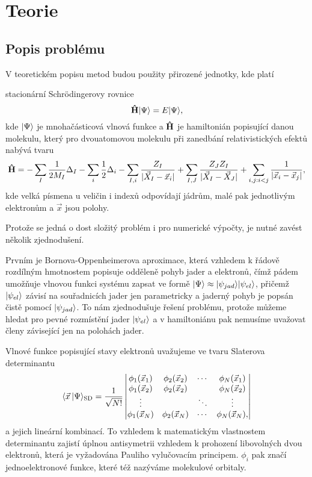 \chapter{Teorie}
\section{Popis problému}
\label{approx}
V teoretickém popisu metod budou použity přirozené jednotky, kde platí


stacionární Schrödingerovy rovnice
\begin{equation}
\mathbf{\hat{H}}| \Psi \rangle = E| \Psi \rangle,
\end{equation}
kde $| \Psi \rangle$ je mnohačásticová vlnová funkce a $\mathbf{\hat{H}}$ je hamiltonián popisující 
danou molekulu, který pro dvouatomovou molekulu při zanedbání relativistických efektů nabývá tvaru
\begin{equation}
\mathbf{\hat{H}} =-\sum_{I}\frac{1}{2M_I}\Delta_I 
-\sum_{i}\frac{1}{2}\Delta_i
 -\sum_{I,i} \frac{Z_{I}}{|\vec{X}_I - \vec{x}_i|}
 +\sum_{I,J} \frac{Z_{J}Z_{I}}{|\vec{X}_I - \vec{X}_J|} 
 +\sum_{i,j:i<j} \frac{1}{|\vec{x}_i - \vec{x}_j|},
\end{equation}
kde velká písmena u veličin i indexů odpovídají jádrům, malé pak jednotlivým 
elektronům a $\vec{x}$ jsou polohy.

Protože se jedná o dost složitý problém i pro numerické výpočty, je nutné zavést 
několik zjednodušení. 

Prvním je Bornova-Oppenheimerova aproximace, která vzhledem k řádově 
rozdílným hmotnostem popisuje odděleně pohyb jader a elektronů, čímž 
pádem umožňuje vlnovou funkci systému zapsat ve formě $| \Psi \rangle \approx 
| \psi_{jad} \rangle| \psi_{el} \rangle$, přičemž $| \psi_{el} \rangle$ závisí na souřadnicích 
jader jen parametricky a jaderný pohyb je popsán čistě pomocí $| \psi_{jad} \rangle$.
To nám zjednodušuje řešení problému, protože můžeme hledat pro pevné rozmístění jader 
$| \psi_{el} \rangle$ a v hamiltoniánu pak nemusíme uvažovat členy závisející jen na 
polohách jader.

Vlnové funkce popisující stavy elektronů uvažujeme ve tvaru Slaterova determinantu
\begin{equation}
\langle \vec{x}\, | \Psi \rangle_{\mathrm{SD}} = \frac{1}{\sqrt{N!}}\begin{vmatrix}
\phi_1(\vec{x}_1) & \phi_2(\vec{x}_2)& \cdots & \phi_N(\vec{x}_1) \\
\phi_1(\vec{x}_2) & \phi_2(\vec{x}_2)&        & \phi_N(\vec{x}_2)\\
\vdots         &               & \ddots & \vdots \\
\phi_1(\vec{x}_N) & \phi_2(\vec{x}_N)& \cdots & \phi_N(\vec{x}_N),
\end{vmatrix}
\end{equation}
a jejich lineární kombinací. To vzhledem k matematickým vlastnostem determinantu zajistí úplnou antisymetrii  vzhledem k prohození libovolných dvou elektronů, která je vyžadována Pauliho vylučovacím principem. $\phi_i$ pak značí jednoelektronové funkce, které též nazýváme molekulové orbitaly.

